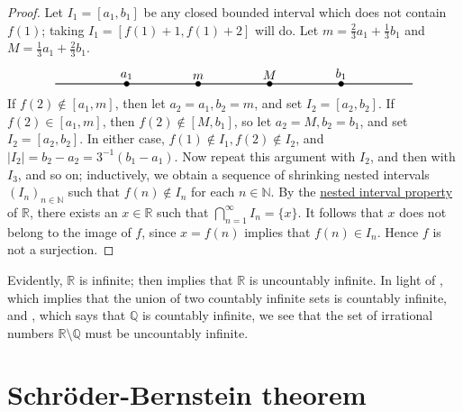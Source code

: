 \documentclass[12pt]{article}
\theoremstyle{definition}
\begin{document}
\begin{proof}
    Let \( I_1 = [a_1, b_1] \) be any closed bounded interval which does not contain \( f(1) \); taking \( I_1 = [f(1) + 1, f(1) + 2] \) will do. Let \( m = \frac{2}{3}a_1 + \frac{1}{3}b_1 \) and \( M = \frac{1}{3}a_1 + \frac{2}{3} b_1 \).
    \[
    \begin{tikzpicture}
        \draw[black, thick] (0, 0) -- (10, 0);
        \filldraw[black] (2, 0) circle (2pt) node[anchor=south]{$a_1$};
        \filldraw[black] (4, 0) circle (2pt) node[anchor=south]{$m$};
        \filldraw[black] (6, 0) circle (2pt) node[anchor=south]{$M$};
        \filldraw[black] (8, 0) circle (2pt) node[anchor=south]{$b_1$};
    \end{tikzpicture}
    \]
    If \( f(2) \not\in [a_1, m] \), then let \( a_2 = a_1, b_2 = m \), and set \( I_2 = [a_2, b_2] \). If \( f(2) \in [a_1, m] \), then \( f(2) \not\in [M, b_1] \), so let \( a_2 = M, b_2 = b_1 \), and set \( I_2 = [a_2, b_2] \). In either case, \( f(1) \not\in I_1, f(2) \not\in I_2 \), and \( |I_2| = b_2 - a_2 = 3^{-1}(b_1 - a_1) \). Now repeat this argument with \( I_2 \), and then with \( I_3 \), and so on; inductively, we obtain a sequence of shrinking nested intervals \( (I_n)_{n \in \mathbb{N}} \) such that \( f(n) \not\in I_n \) for each \( n \in \mathbb{N} \). By the \href{https://lew98.github.io/Mathematics/Miscellaneous/Nested_interval_property.pdf}{nested interval property} of \( \mathbb{R} \), there exists an \( x \in \mathbb{R} \) such that \( \bigcap_{n=1}^{\infty} I_n = \{ x \} \). It follows that \( x \) does not belong to the image of \( f \), since \( x = f(n) \) implies that \( f(n) \in I_n \). Hence \( f \) is not a surjection.
\end{proof}

Evidently, \( \mathbb{R} \) is infinite;  then implies that \( \mathbb{R} \) is uncountably infinite. In light of , which implies that the union of two countably infinite sets is countably infinite, and , which says that \( \mathbb{Q} \) is countably infinite, we see that the set of irrational numbers \( \mathbb{R} \setminus \mathbb{Q} \) must be uncountably infinite.

\section{Schröder-Bernstein theorem}
\label{sec:schroder-bernstein_theorem}
\end{document}
